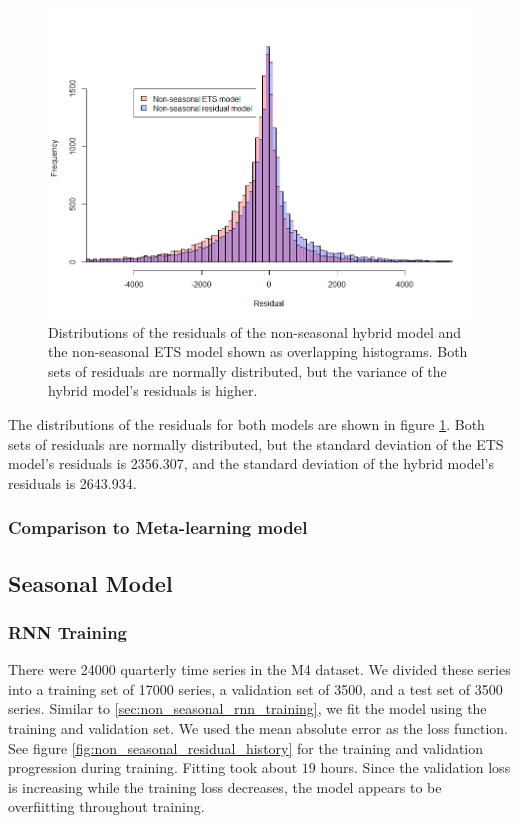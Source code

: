 \documentclass[a4paper,12pt]{article}
\theoremstyle{definition}
\begin{document}
\begin{figure}[ht]
	\centering
	\includegraphics[width=\textwidth]{figures/non_seasonal_res_vs_non_seasonal_ets.png}
	\caption{Distributions of the residuals of the non-seasonal hybrid model and the non-seasonal ETS model shown as overlapping histograms. Both sets of residuals are normally distributed, but the variance of the hybrid model's residuals is higher.}
	\label{fig:non_seasonal_res_vs_non_seasonal_ets}
\end{figure}

The distributions of the residuals for both models are shown in figure \ref{fig:non_seasonal_res_vs_non_seasonal_ets}. Both sets of residuals are normally distributed, but the standard deviation of the ETS model's residuals is 2356.307, and the standard deviation of the hybrid model's residuals is 2643.934.

\subsubsection{Comparison to Meta-learning model}


\subsection{Seasonal Model}
\subsubsection{RNN Training}
There were  \num[group-separator={,}]{24000} quarterly time series in the M4 dataset. We divided these series into a training set of  \num[group-separator={,}]{17000} series, a validation set of  \num[group-separator={,}]{3500}, and a test set of  \num[group-separator={,}]{3500} series. Similar to \ref{sec:non_seasonal_rnn_training}, we fit the model using the training and validation set. We used the mean absolute error as the loss function. See figure \ref{fig:non_seasonal_residual_history} for the training and validation progression during training. Fitting took about $19$ hours. Since the validation loss is increasing while the training loss decreases, the model appears to be overfiitting throughout training. 
\end{document}
